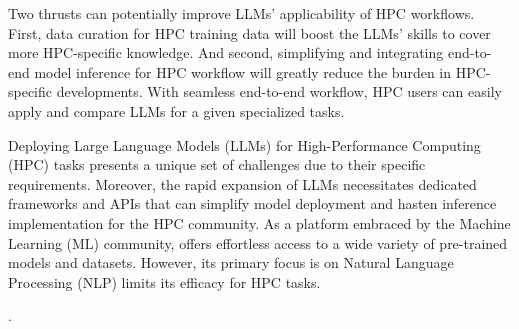 Two thrusts can potentially improve LLMs' applicability of HPC workflows.  First, data curation for HPC training data will boost the LLMs' skills to cover more HPC-specific knowledge.  And second, simplifying and integrating end-to-end model inference for HPC workflow will greatly reduce the burden in HPC-specific developments.  With seamless end-to-end workflow, HPC users can easily apply and compare LLMs for a given specialized tasks.

Deploying Large Language Models (LLMs) for High-Performance Computing (HPC) tasks presents a unique set of challenges due to their specific requirements.  Moreover, the rapid expansion of LLMs necessitates dedicated frameworks and APIs that can simplify model deployment and hasten inference implementation for the HPC community.
As a platform embraced by the Machine Learning (ML) community, \face offers effortless access to a wide variety of pre-trained models and datasets. However, its primary focus is on Natural Language Processing (NLP) limits its efficacy for HPC tasks.


. 
